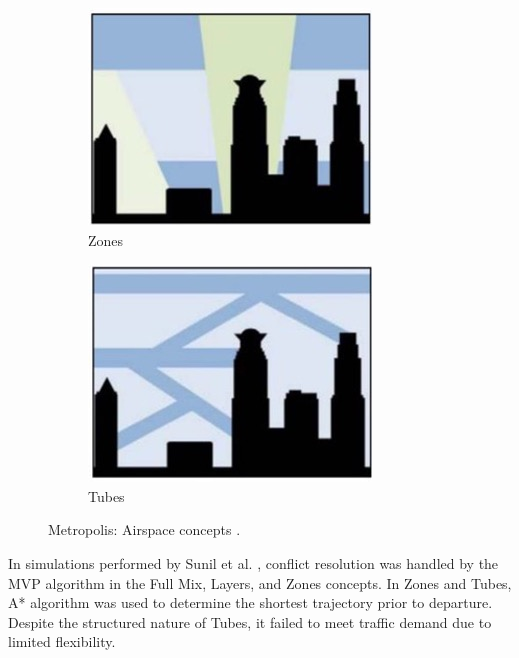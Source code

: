 \begin{figure}[!ht]
\begin{subfigure}{.23\textwidth}
        \includegraphics[width=\textwidth]{img/zones.jpg}
        \caption{Zones}
        \label{Zones}
    \end{subfigure}
    \begin{subfigure}{.23\textwidth}
        \includegraphics[width=\textwidth]{img/tubes.jpg}
        \caption{Tubes}
        \label{tubes}
    \end{subfigure}
    \caption{Metropolis: Airspace concepts \cite{Schuchardt_2023}.}
    \label{airspace-concepts}
\end{figure}

In simulations performed by Sunil et al. \cite{Sunil_2015}, conflict resolution was handled by the \gls{MVP} algorithm in the Full Mix, Layers, and Zones concepts. 
In Zones and Tubes, A* algorithm was used to determine the shortest trajectory prior to departure. 
Despite the structured nature of Tubes, it failed to meet traffic demand due to limited flexibility.

